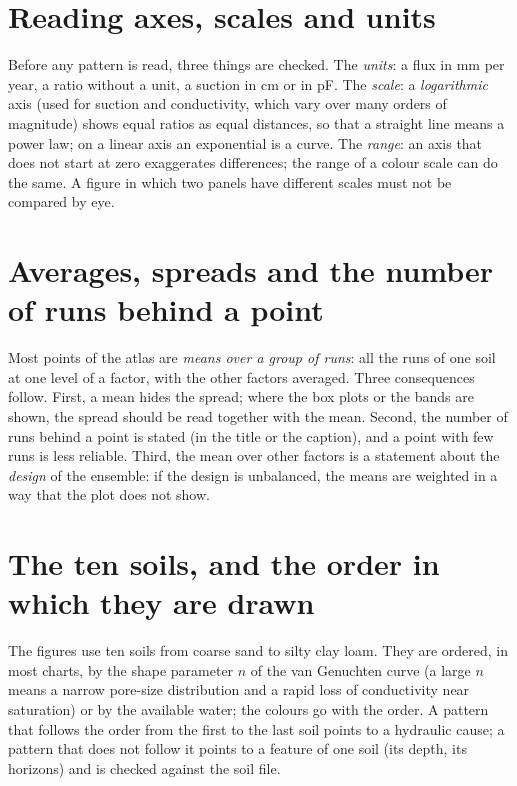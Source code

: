\section{Reading axes, scales and units}
Before any pattern is read, three things are checked. The \emph{units}: a flux in mm per year, a ratio without a unit, a suction in cm or in pF. The \emph{scale}: a \emph{logarithmic} axis (used for suction and conductivity, which vary over many orders of magnitude) shows equal ratios as equal distances, so that a straight line means a power law; on a linear axis an exponential is a curve. The \emph{range}: an axis that does not start at zero exaggerates differences; the range of a colour scale can do the same. A figure in which two panels have different scales must not be compared by eye.

\section{Averages, spreads and the number of runs behind a point}
Most points of the atlas are \emph{means over a group of runs}: all the runs of one soil at one level of a factor, with the other factors averaged. Three consequences follow. First, a mean hides the spread; where the box plots or the bands are shown, the spread should be read together with the mean. Second, the number of runs behind a point is stated (in the title or the caption), and a point with few runs is less reliable. Third, the mean over other factors is a statement about the \emph{design} of the ensemble: if the design is unbalanced, the means are weighted in a way that the plot does not show.

\section{The ten soils, and the order in which they are drawn}
The figures use ten soils from coarse sand to silty clay loam. They are ordered, in most charts, by the shape parameter $n$ of the van Genuchten curve (a large $n$ means a narrow pore-size distribution and a rapid loss of conductivity near saturation) or by the available water; the colours go with the order. A pattern that follows the order from the first to the last soil points to a hydraulic cause; a pattern that does not follow it points to a feature of one soil (its depth, its horizons) and is checked against the soil file.
